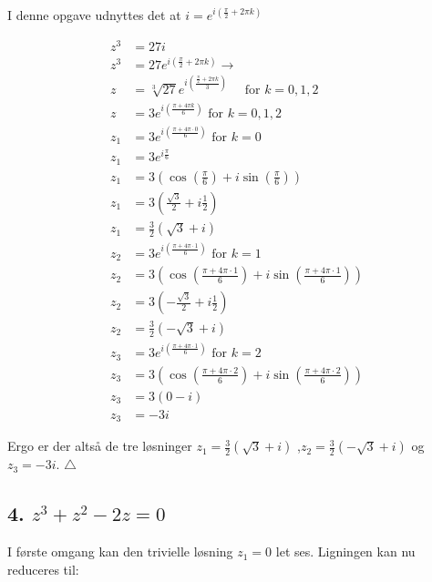 \documentclass[a4paper, 12pt]{article}
\begin{document}
I denne opgave udnyttes det at \(i=e^{i\left(\frac{\pi}{2}+2 \pi k \right)}\)

\begin{align*}
    z^3 &= 27 i \\
    z^3 &= 27 e^{i\left(\frac{\pi}{2}+2 \pi k \right)} \to\\
    z &= \sqrt[3]{27} e^{i\left(\frac{\frac{\pi}{2}+2 \pi k}{3} \right)} \quad \text{ for } k=0,1,2\\
    z &= 3 e^{i\left(\frac{\pi+4 \pi k}{6} \right)} \text{ for } k=0,1,2 \\
    z_1 &= 3 e^{i\left(\frac{\pi+4 \pi \cdot 0}{6} \right)}  \text{ for } k=0\\
    z_1 &= 3 e^{i\frac{\pi}{6}}  \\
    z_1 &= 3 \left( \cos\left(\frac{\pi}{6}\right) + i \sin\left(\frac{\pi}{6}\right)\right)  \\
    z_1 &= 3 \left( \frac{\sqrt{3}}{2} + i \frac{1}{2}\right)\\
    z_1 &= \frac{3}{2} \left( \sqrt{3} + i \right)\\
    z_2 &= 3 e^{i\left(\frac{\pi+4 \pi \cdot 1}{6} \right)}  \text{ for } k=1\\
    z_2 &= 3 \left( \cos\left(\frac{\pi+4 \pi \cdot 1}{6}\right) + i \sin\left(\frac{\pi+4 \pi \cdot 1}{6}\right)\right)  \\
    z_2 &= 3 \left( -\frac{\sqrt{3}}{2} + i \frac{1}{2}\right)\\
    z_2 &= \frac{3}{2} \left(- \sqrt{3} + i \right)\\
    z_3 &= 3 e^{i\left(\frac{\pi+4 \pi \cdot 1}{6} \right)}  \text{ for } k=2\\
    z_3 &= 3 \left( \cos\left(\frac{\pi+4 \pi \cdot 2}{6}\right) + i \sin\left(\frac{\pi+4 \pi \cdot 2}{6}\right)\right)  \\
    z_3 &= 3 \left( 0 - i \right)\\
    z_3 &= -3i
\end{align*}

Ergo er der altså de tre løsninger \(z_1=\frac{3}{2} \left(\sqrt{3} + i\right)\) ,\(z_2=\frac{3}{2} \left(-\sqrt{3} + i\right)\) og \(z_3 = -3i\). \(\triangle\)

\subsection*{4. \(z^3+z^2-2z =0\)}
\label{sec:org9e3ddb5}

I første omgang kan den trivielle løsning \(z_1=0\) let ses. Ligningen kan nu reduceres til:
\end{document}
